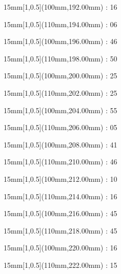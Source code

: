 \documentclass[a5paper]{memoir}
\begin{document}
\begin{textblock*}{15mm}[1,0.5](100mm,192.00mm) : 16\gridstrut\end{textblock*}
\begin{textblock*}{15mm}[1,0.5](110mm,194.00mm) : 06\gridstrut\end{textblock*}
\begin{textblock*}{15mm}[1,0.5](100mm,196.00mm) : 46\gridstrut\end{textblock*}
\begin{textblock*}{15mm}[1,0.5](110mm,198.00mm) : 50\gridstrut\end{textblock*}
\begin{textblock*}{15mm}[1,0.5](100mm,200.00mm) : 25\gridstrut\end{textblock*}
\begin{textblock*}{15mm}[1,0.5](110mm,202.00mm) : 25\gridstrut\end{textblock*}
\begin{textblock*}{15mm}[1,0.5](100mm,204.00mm) : 55\gridstrut\end{textblock*}
\begin{textblock*}{15mm}[1,0.5](110mm,206.00mm) : 05\gridstrut\end{textblock*}
\begin{textblock*}{15mm}[1,0.5](100mm,208.00mm) : 41\gridstrut\end{textblock*}
\begin{textblock*}{15mm}[1,0.5](110mm,210.00mm) : 46\gridstrut\end{textblock*}
\begin{textblock*}{15mm}[1,0.5](100mm,212.00mm) : 10\gridstrut\end{textblock*}
\begin{textblock*}{15mm}[1,0.5](110mm,214.00mm) : 16\gridstrut\end{textblock*}
\begin{textblock*}{15mm}[1,0.5](100mm,216.00mm) : 45\gridstrut\end{textblock*}
\begin{textblock*}{15mm}[1,0.5](110mm,218.00mm) : 45\gridstrut\end{textblock*}
\begin{textblock*}{15mm}[1,0.5](100mm,220.00mm) : 16\gridstrut\end{textblock*}
\begin{textblock*}{15mm}[1,0.5](110mm,222.00mm) : 15\gridstrut\end{textblock*}
\end{document}
